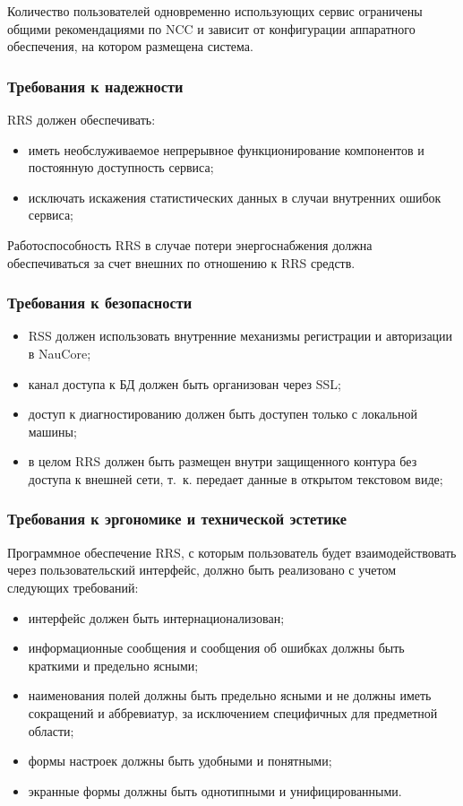 Количество пользователей одновременно использующих сервис ограничены
общими рекомендациями по NCC и зависит от конфигурации аппаратного обеспечения,
на котором размещена система.

\subsubsection{Требования к надежности}

RRS должен обеспечивать:
\begin{itemize}
    \item иметь необслуживаемое непрерывное функционирование компонентов и постоянную доступность сервиса;
    \item исключать искажения статистических данных в случаи внутренних ошибок сервиса;
\end{itemize}

Работоспособность RRS в случае потери энергоснабжения должна обеспечиваться за счет внешних по отношению к RRS средств.

\subsubsection{Требования к безопасности}
\begin{itemize}
    \item RSS должен использовать внутренние механизмы регистрации и авторизации в NauCore;
    \item канал доступа к БД должен быть организован через SSL\@;
    \item доступ к диагностированию должен быть доступен только с локальной машины;
    \item в целом RRS должен быть размещен внутри защищенного контура без доступа к внешней сети, т.~к. передает данные в открытом текстовом виде;
\end{itemize}

\subsubsection{Требования к эргономике и технической эстетике}

Программное обеспечение RRS, с которым пользователь будет взаимодействовать
через пользовательский интерфейс,
должно быть реализовано с учетом следующих требований:
\begin{itemize}
    \item интерфейс должен быть интернационализован;
    \item информационные сообщения и сообщения об ошибках должны быть краткими и предельно ясными;
    \item наименования полей должны быть предельно ясными и не должны иметь сокращений и аббревиатур, за исключением специфичных для предметной области;
    \item формы настроек должны быть удобными и понятными;
    \item экранные формы должны быть однотипными и унифицированными.
\end{itemize}

